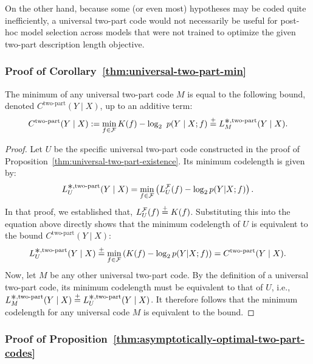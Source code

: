  On the other hand, because some (or even most) hypotheses may be coded quite inefficiently, a universal two-part code would not necessarily be useful for post-hoc model selection across models that were not trained to optimize the given two-part description length objective.

\subsubsection{Proof of Corollary~\ref{thm:universal-two-part-min}} 

\begin{cor*} The minimum of any universal two-part code $M$ is equal to the following bound, denoted $C^{\text{two-part}}(Y \mid X)$, up to an additive term:
\begin{equation}
C^{\text{two-part}}(Y \mid X) := \min_{f \in \gF} K(f) - \log_2~p(Y \mid X;f)
 \eqc L_M^{\bigast,\text{two-part}}(Y \mid X).
\end{equation}
\end{cor*}

\begin{proof}
Let $U$ be the specific universal two-part code constructed in the proof of Proposition~\ref{thm:universal-two-part-existence}. Its minimum codelength is given by:
\begin{equation}
    L_U^{\bigast,\text{two-part}}(Y \mid X) = \min_{f \in \gF} \left( L_U^\gF(f) - \log_2 p(Y|X;f) \right).
\end{equation}
In that proof, we established that, $L_U^{\mathcal{F}}(f) \stackrel{+}{=} K(f)$. Substituting this into the equation above directly shows that the minimum codelength of $U$ is equivalent to the bound $C^{\text{two-part}}(Y \mid X)$:
\begin{equation}
    L_U^{\bigast,\text{two-part}}(Y \mid X) \eqc \min_{f \in \gF} \left( K(f) - \log_2 p(Y|X;f) \right) = C^{\text{two-part}}(Y \mid X).
\end{equation}
Now, let $M$ be any other universal two-part code. By the definition of a universal two-part code, its minimum codelength must be equivalent to that of $U$, i.e., $L_{M}^{\bigast,\text{two-part}}(Y \mid X) \eqc L_U^{\bigast,\text{two-part}}(Y \mid X)$. It therefore follows that the minimum codelength for any universal code $M$ is equivalent to the bound.
\end{proof}


\subsubsection{Proof of Proposition~\ref{thm:asymptotically-optimal-two-part-codes}}
\label{sec:app-proof-of-asymptotically-optimal-two-part-codes}

